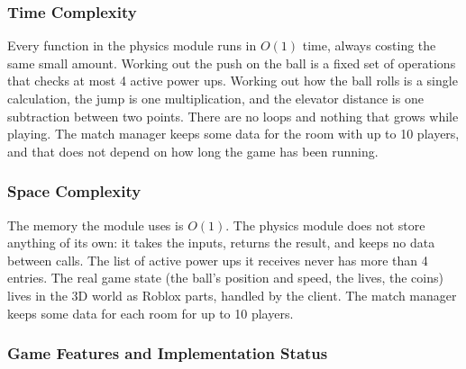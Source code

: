 \documentclass[12pt,letterpaper]{article}
\begin{document}
\subsubsection{Time Complexity}

Every function in the physics module runs in $O(1)$ time, always costing the same small amount. Working out the push on the ball is a fixed set of operations that checks at most 4 active power ups. Working out how the ball rolls is a single calculation, the jump is one multiplication, and the elevator distance is one subtraction between two points. There are no loops and nothing that grows while playing. The match manager keeps some data for the room with up to 10 players, and that does not depend on how long the game has been running.

\subsubsection{Space Complexity}

The memory the module uses is $O(1)$. The physics module does not store anything of its own: it takes the inputs, returns the result, and keeps no data between calls. The list of active power ups it receives never has more than 4 entries. The real game state (the ball's position and speed, the lives, the coins) lives in the 3D world as Roblox parts, handled by the client. The match manager keeps some data for each room for up to 10 players.

\subsubsection{Game Features and Implementation Status}
\end{document}
